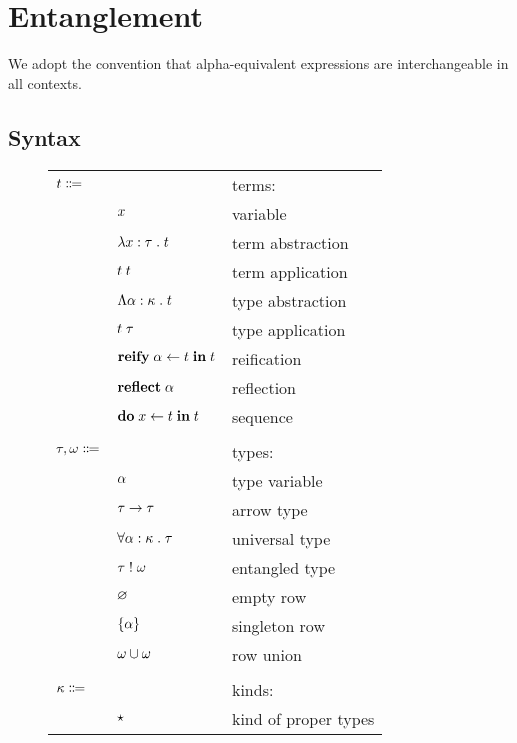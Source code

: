 \section{Entanglement}

  We adopt the convention that alpha-equivalent expressions are interchangeable in all contexts.

  \subsection{Syntax}

    \begin{figure}[H]
      \begin{center}
        \begin{tabular}{l l l}
          $t \Coloneqq$ & & terms: \\
          & $x$ & variable \\
          & $\lambda x : \tau \; . \; t$ & term abstraction \\
          & $t \; t$ & term application \\
          & $\Lambda \alpha : \kappa \; . \; t$ & type abstraction \\
          & $t \; \tau$ & type application \\
          & $\textbf{reify} \; \alpha \leftarrow t \; \textbf{in} \; t$ & reification \\
          & $\textbf{reflect} \; \alpha$ & reflection \\
          & $\textbf{do} \; x \leftarrow t \; \textbf{in} \; t$ & sequence \\
          \\
          $\tau, \omega \Coloneqq$ & & types: \\
          & $\alpha$ & type variable \\
          & $\tau \rightarrow \tau$ & arrow type \\
          & $\forall \alpha : \kappa \; . \; \tau$ & universal type \\
          & $\tau \; ! \; \omega$ & entangled type \\
          & $\varnothing$ & empty row \\
          & $\left\{ \alpha \right\}$ & singleton row \\
          & $\omega \cup \omega$ & row union \\
          \\
          $\kappa \Coloneqq$ & & kinds: \\
          & $\star$ & kind of proper types \\

\end{tabular}
\end{center}
\end{figure}
